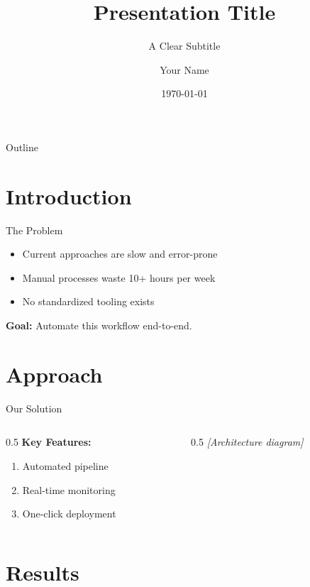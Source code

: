 \documentclass[aspectratio=169]{beamer}
\title{Presentation Title}
\subtitle{A Clear Subtitle}
\author{Your Name}
\institute{Organization}
\date{\today}
\begin{document}
\begin{frame}
\titlepage
\end{frame}

\begin{frame}{Outline}
\tableofcontents
\end{frame}

\section{Introduction}

\begin{frame}{The Problem}
\begin{itemize}
  \item Current approaches are slow and error-prone
  \item Manual processes waste 10+ hours per week
  \item No standardized tooling exists
\end{itemize}

\vspace{12pt}
\textbf{Goal:} Automate this workflow end-to-end.
\end{frame}

\section{Approach}

\begin{frame}{Our Solution}
\begin{columns}
\begin{column}{0.5\textwidth}
  \textbf{Key Features:}
  \begin{enumerate}
    \item Automated pipeline
    \item Real-time monitoring
    \item One-click deployment
  \end{enumerate}
\end{column}
\begin{column}{0.5\textwidth}
  \centering
  \textit{[Architecture diagram]}
\end{column}
\end{columns}
\end{frame}

\section{Results}
\end{document}
